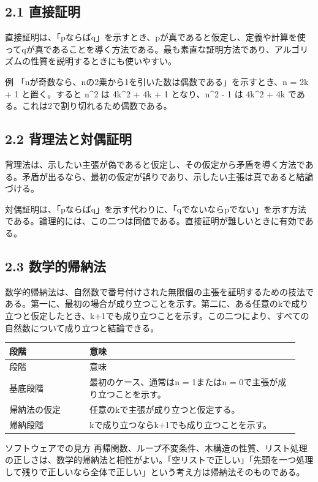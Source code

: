 \documentclass[uplatex,dvipdfmx,a4paper,10pt]{jsarticle}
\begin{document}
\subsection{2.1 直接証明}
直接証明は、「pならばq」を示すとき、pが真であると仮定し、定義や計算を使ってqが真であることを導く方法である。最も素直な証明方法であり、アルゴリズムの性質を説明するときにも使いやすい。

\begin{infobox}{例}
「nが奇数なら、nの2乗から1を引いた数は偶数である」を示すとき、n = 2k + 1 と置く。すると n\textasciicircum{}2 は 4k\textasciicircum{}2 + 4k + 1 となり、n\textasciicircum{}2 - 1 は 4k\textasciicircum{}2 + 4k である。これは2で割り切れるため偶数である。
\end{infobox}
\subsection{2.2 背理法と対偶証明}
背理法は、示したい主張が偽であると仮定し、その仮定から矛盾を導く方法である。矛盾が出るなら、最初の仮定が誤りであり、示したい主張は真であると結論づける。

対偶証明は、「pならばq」を示す代わりに、「qでないならpでない」を示す方法である。論理的には、この二つは同値である。直接証明が難しいときに有効である。

\subsection{2.3 数学的帰納法}
数学的帰納法は、自然数で番号付けされた無限個の主張を証明するための技法である。第一に、最初の場合が成り立つことを示す。第二に、ある任意のkで成り立つと仮定したとき、k+1でも成り立つことを示す。この二つにより、すべての自然数について成り立つと結論できる。

\begin{longtable}{>{\raggedright\arraybackslash}p{0.26\linewidth} >{\raggedright\arraybackslash}p{0.68\linewidth}}
\toprule
段階 & 意味 \\
\midrule
\endfirsthead
\toprule
段階 & 意味 \\
\midrule
\endhead
基底段階 & 最初のケース、通常はn = 1またはn = 0で主張が成り立つことを示す。 \\
帰納法の仮定 & 任意のkで主張が成り立つと仮定する。 \\
帰納段階 & kで成り立つならk+1でも成り立つことを示す。 \\
\bottomrule
\end{longtable}
\begin{infobox}{ソフトウェアでの見方}
再帰関数、ループ不変条件、木構造の性質、リスト処理の正しさは、数学的帰納法と相性がよい。「空リストで正しい」「先頭を一つ処理して残りで正しいなら全体で正しい」という考え方は帰納法そのものである。
\end{infobox}
\end{document}
